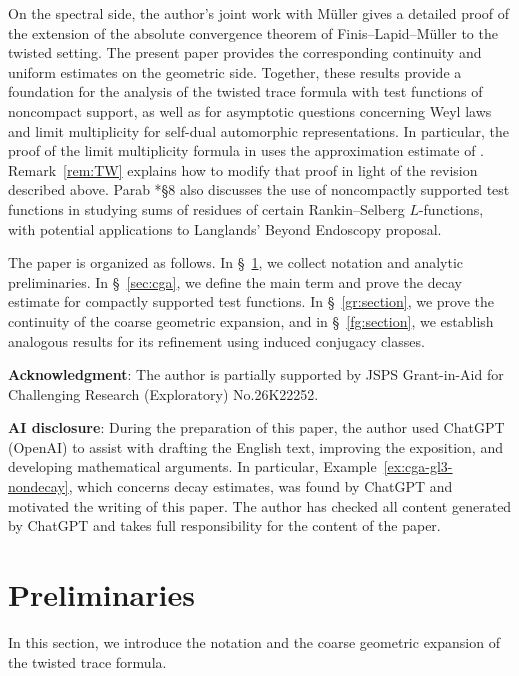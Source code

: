 \documentclass[12pt]{amsart}
\theoremstyle{definition}
\theoremstyle{plain}
\theoremstyle{remark}
\numberwithin{equation}{section}
\begin{document}
On the spectral side, the author's joint work with M\"uller \cite{MW26} gives a detailed proof of the extension of the absolute convergence theorem of Finis--Lapid--M\"uller to the twisted setting.
The present paper provides the corresponding continuity and uniform estimates on the geometric side.
Together, these results provide a foundation for the analysis of the twisted trace formula with test functions of noncompact support, as well as for asymptotic questions concerning Weyl laws and limit multiplicity for self-dual automorphic representations.
In particular, the proof of the limit multiplicity formula in \cite{TW26} uses the approximation estimate of \cite{Par19}.
Remark~\ref{rem:TW} explains how to modify that proof in light of the revision described above.
Parab \cite{Par19}*{\S8} also discusses the use of noncompactly supported test functions in studying sums of residues of certain Rankin--Selberg \(L\)-functions, with potential applications to Langlands' Beyond Endoscopy proposal.

The paper is organized as follows.
In \S~\ref{sec:preliminaries}, we collect notation and analytic preliminaries.
In \S~\ref{sec:cga}, we define the main term and prove the decay estimate for compactly supported test functions.
In \S~\ref{gr:section}, we prove the continuity of the coarse geometric expansion, and in \S~\ref{fg:section}, we establish analogous results for its refinement using induced conjugacy classes.


\medskip
\noindent
{\bf Acknowledgment}: The author is partially supported by JSPS Grant-in-Aid for Challenging Research (Exploratory) No.26K22252.

\medskip
\noindent
{\bf AI disclosure}: During the preparation of this paper, the author used ChatGPT (OpenAI) to assist with drafting the English text, improving the exposition, and developing mathematical arguments. In particular, Example~\ref{ex:cga-gl3-nondecay}, which concerns decay estimates, was found by ChatGPT and motivated the writing of this paper. The author has checked all content generated by ChatGPT and takes full responsibility for the content of the paper.


\section{Preliminaries}
\label{sec:preliminaries}

In this section, we introduce the notation and the coarse geometric expansion of the twisted trace formula.
\end{document}
